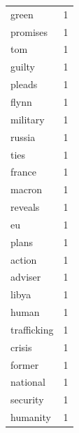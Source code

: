 \begin{tabular}{lr}
green & 1 \\
promises & 1 \\
tom & 1 \\
guilty & 1 \\
pleads & 1 \\
flynn & 1 \\
military & 1 \\
russia & 1 \\
ties & 1 \\
france & 1 \\
macron & 1 \\
reveals & 1 \\
eu & 1 \\
plans & 1 \\
action & 1 \\
adviser & 1 \\
libya & 1 \\
human & 1 \\
trafficking & 1 \\
crisis & 1 \\
former & 1 \\
national & 1 \\
security & 1 \\
humanity & 1 \\
\bottomrule
\end{tabular}
